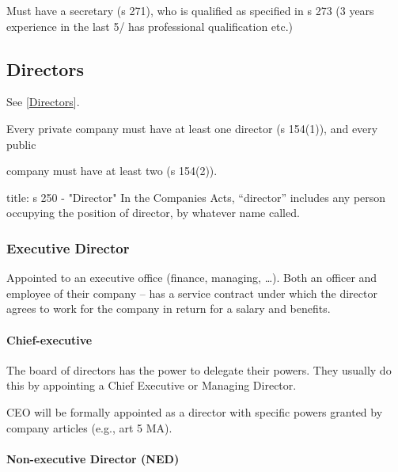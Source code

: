 \documentclass[
]{article}
\newenvironment{Shaded}{}{}
\newcommand{\NormalTok}[1]{#1}
\begin{document}
Must have a secretary (s 271), who is qualified as specified in s 273 (3
years experience in the last 5/ has professional qualification etc.)

\hypertarget{directors-1}{%
\subsection{Directors}\label{directors-1}}

See {[}\protect\hyperlink{directors-1}{Directors}{]}.

Every private company must have at least one director (s 154(1)), and
every public

company must have at least two (s 154(2)).

\begin{Shaded}
\begin{Highlighting}[]
\NormalTok{title: s 250 {-} "Director"}
\NormalTok{In the Companies Acts, “director” includes any person occupying the position of director, by whatever name called. }
\end{Highlighting}
\end{Shaded}

\hypertarget{executive-director}{%
\subsubsection{Executive Director}\label{executive-director}}

Appointed to an executive office (finance, managing, \ldots). Both an
officer and employee of their company -- has a service contract under
which the director agrees to work for the company in return for a salary
and benefits.

\hypertarget{chief-executive}{%
\paragraph{Chief-executive}\label{chief-executive}}

The board of directors has the power to delegate their powers. They
usually do this by appointing a Chief Executive or Managing Director.

CEO will be formally appointed as a director with specific powers
granted by company articles (e.g., art 5 MA).

\hypertarget{non-executive-director-ned}{%
\paragraph{Non-executive Director
(NED)}\label{non-executive-director-ned}}
\end{document}
